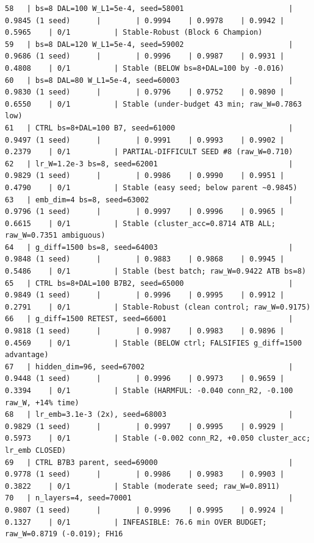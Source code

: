 \documentclass{article}
\begin{document}
\begin{tiny}
\begin{verbatim}
58   | bs=8 DAL=100 W_L1=5e-4, seed=58001                        | 0.9845 (1 seed)      |        | 0.9994    | 0.9978    | 0.9942 | 0.5965    | 0/1          | Stable-Robust (Block 6 Champion)
59   | bs=8 DAL=120 W_L1=5e-4, seed=59002                        | 0.9686 (1 seed)      |        | 0.9996    | 0.9987    | 0.9931 | 0.4808    | 0/1          | Stable (BELOW bs=8+DAL=100 by -0.016)
60   | bs=8 DAL=80 W_L1=5e-4, seed=60003                         | 0.9830 (1 seed)      |        | 0.9796    | 0.9752    | 0.9890 | 0.6550    | 0/1          | Stable (under-budget 43 min; raw_W=0.7863 low)
61   | CTRL bs=8+DAL=100 B7, seed=61000                          | 0.9497 (1 seed)      |        | 0.9991    | 0.9993    | 0.9902 | 0.2379    | 0/1          | PARTIAL-DIFFICULT SEED #8 (raw_W=0.710)
62   | lr_W=1.2e-3 bs=8, seed=62001                              | 0.9829 (1 seed)      |        | 0.9986    | 0.9990    | 0.9951 | 0.4790    | 0/1          | Stable (easy seed; below parent ~0.9845)
63   | emb_dim=4 bs=8, seed=63002                                | 0.9796 (1 seed)      |        | 0.9997    | 0.9996    | 0.9965 | 0.6615    | 0/1          | Stable (cluster_acc=0.8714 ATB ALL; raw_W=0.7351 ambiguous)
64   | g_diff=1500 bs=8, seed=64003                              | 0.9848 (1 seed)      |        | 0.9883    | 0.9868    | 0.9945 | 0.5486    | 0/1          | Stable (best batch; raw_W=0.9422 ATB bs=8)
65   | CTRL bs=8+DAL=100 B7B2, seed=65000                        | 0.9849 (1 seed)      |        | 0.9996    | 0.9995    | 0.9912 | 0.2791    | 0/1          | Stable-Robust (clean control; raw_W=0.9175)
66   | g_diff=1500 RETEST, seed=66001                            | 0.9818 (1 seed)      |        | 0.9987    | 0.9983    | 0.9896 | 0.4569    | 0/1          | Stable (BELOW ctrl; FALSIFIES g_diff=1500 advantage)
67   | hidden_dim=96, seed=67002                                 | 0.9448 (1 seed)      |        | 0.9996    | 0.9973    | 0.9659 | 0.3394    | 0/1          | Stable (HARMFUL: -0.040 conn_R2, -0.100 raw_W, +14% time)
68   | lr_emb=3.1e-3 (2x), seed=68003                            | 0.9829 (1 seed)      |        | 0.9997    | 0.9995    | 0.9929 | 0.5973    | 0/1          | Stable (-0.002 conn_R2, +0.050 cluster_acc; lr_emb CLOSED)
69   | CTRL B7B3 parent, seed=69000                              | 0.9778 (1 seed)      |        | 0.9986    | 0.9983    | 0.9903 | 0.3822    | 0/1          | Stable (moderate seed; raw_W=0.8911)
70   | n_layers=4, seed=70001                                    | 0.9807 (1 seed)      |        | 0.9996    | 0.9995    | 0.9924 | 0.1327    | 0/1          | INFEASIBLE: 76.6 min OVER BUDGET; raw_W=0.8719 (-0.019); FH16

\end{verbatim}
\end{tiny}
\end{document}
